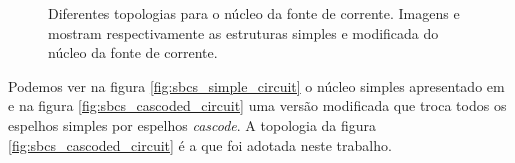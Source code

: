 \documentclass[10pt,a4paper]{extreport}
\newcommand{\?}{\stackrel{?}{=}}
\begin{document}
\begin{figure}[htp!]
    \centering
    \hspace{1.5cm}
    \caption[Diferentes topologias para o núcleo da fonte de corrente.]{Diferentes topologias para o núcleo da fonte de corrente. Imagens  e  mostram respectivamente as estruturas simples e modificada do núcleo da fonte de corrente.}
    \label{fig:core_topology}
\end{figure}

Podemos ver na figura \ref{fig:sbcs_simple_circuit} o núcleo simples apresentado em \cite{sbcs} e na figura \ref{fig:sbcs_cascoded_circuit} uma versão modificada que troca todos os espelhos simples por espelhos \textit{cascode}. A topologia da figura \ref{fig:sbcs_cascoded_circuit} é a que foi adotada neste trabalho.
\end{document}
